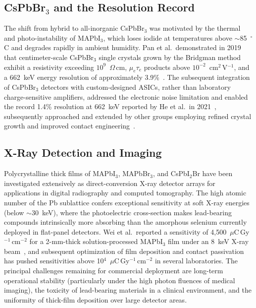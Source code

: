 \subsection{CsPbBr$_3$ and the Resolution Record}

The shift from hybrid to all-inorganic CsPbBr$_3$ was motivated by
the thermal and photo-instability of MAPbI$_3$, which loses iodide
at temperatures above $\sim$85~$^\circ$C and degrades rapidly in
ambient humidity.  Pan et al.\ demonstrated in 2019 that centimeter-scale
CsPbBr$_3$ single crystals grown by the Bridgman method exhibit a
resistivity exceeding $10^9$~$\Omega$\,cm, $\mu_e\tau_e$ products
above $10^{-2}$~cm$^2$\,V$^{-1}$, and a 662~keV energy resolution of
approximately 3.9\%~\cite{Pan2019}.  The subsequent integration of
CsPbBr$_3$ detectors with custom-designed ASICs, rather than
laboratory charge-sensitive amplifiers, addressed the electronic noise
limitation and enabled the record 1.4\% resolution at 662~keV reported
by He et al.\ in 2021~\cite{He_NatPhoton_2021}, subsequently approached
and extended by other groups employing refined crystal growth and improved
contact engineering~\cite{NatComm_CsPbBr3_ASIC}.

\subsection{X-Ray Detection and Imaging}

Polycrystalline thick films of MAPbI$_3$, MAPbBr$_3$, and
CsPbI$_2$Br have been investigated extensively as direct-conversion
X-ray detector arrays for applications in digital radiography and
computed tomography.  The high atomic number of the Pb sublattice
confers exceptional sensitivity at soft X-ray energies
(below $\sim$30~keV), where the photoelectric cross-section makes
lead-bearing compounds intrinsically more absorbing than the amorphous
selenium currently deployed in flat-panel detectors.  Wei et al.\ reported
a sensitivity of 4,500~$\mu$C\,Gy$^{-1}$\,cm$^{-2}$ for a 2-mm-thick
solution-processed MAPbI$_3$ film under an 8~keV X-ray beam~\cite{Wei2017},
and subsequent optimization of film deposition and contact passivation
has pushed sensitivities above 10$^4$~$\mu$C\,Gy$^{-1}$\,cm$^{-2}$
in several laboratories.  The principal challenges remaining for
commercial deployment are long-term operational stability (particularly
under the high photon fluences of medical imaging), the toxicity of
lead-bearing materials in a clinical environment, and the uniformity
of thick-film deposition over large detector areas.

